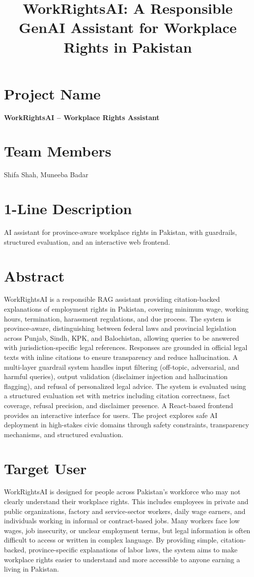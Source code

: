 \documentclass[10pt]{article}
\title{\textbf{WorkRightsAI: A Responsible GenAI Assistant for Workplace Rights in Pakistan}}
\date{}
\begin{document}
\maketitle
\vspace{-10pt}

\section*{Project Name}
\textbf{WorkRightsAI – Workplace Rights Assistant}

\section*{Team Members}
Shifa Shah, Muneeba Badar

\section*{1-Line Description}
AI assistant for province-aware workplace rights in Pakistan, with guardrails, structured evaluation, and an interactive web frontend.

\section*{Abstract}
WorkRightsAI is a responsible RAG assistant providing citation-backed explanations of employment rights in Pakistan, covering minimum wage, working hours, termination, harassment regulations, and due process. The system is province-aware, distinguishing between federal laws and provincial legislation across Punjab, Sindh, KPK, and Balochistan, allowing queries to be answered with jurisdiction-specific legal references. Responses are grounded in official legal texts with inline citations to ensure transparency and reduce hallucination. A multi-layer guardrail system handles input filtering (off-topic, adversarial, and harmful queries), output validation (disclaimer injection and hallucination flagging), and refusal of personalized legal advice. The system is evaluated using a structured evaluation set with metrics including citation correctness, fact coverage, refusal precision, and disclaimer presence. A React-based frontend provides an interactive interface for users. The project explores safe AI deployment in high-stakes civic domains through safety constraints, transparency mechanisms, and structured evaluation.

\section*{Target User}
WorkRightsAI is designed for people across Pakistan's workforce who may not clearly understand their workplace rights. This includes employees in private and public organizations, factory and service-sector workers, daily wage earners, and individuals working in informal or contract-based jobs. Many workers face low wages, job insecurity, or unclear employment terms, but legal information is often difficult to access or written in complex language. By providing simple, citation-backed, province-specific explanations of labor laws, the system aims to make workplace rights easier to understand and more accessible to anyone earning a living in Pakistan.
\end{document}
